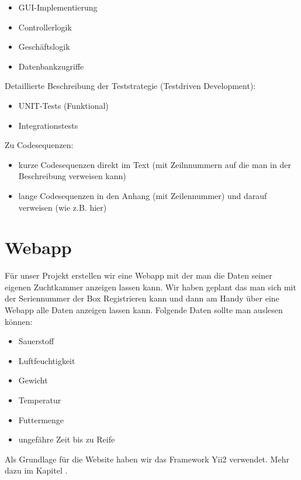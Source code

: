 \begin{itemize}
	\item GUI-Implementierung
	\item Controllerlogik
	\item Geschäftslogik
	\item Datenbankzugriffe
\end{itemize}

Detaillierte Beschreibung der Teststrategie (Testdriven Development):

\begin{itemize}
	\item UNIT-Tests (Funktional)
	\item Integrationstests
\end{itemize}

Zu Codesequenzen:
\begin{itemize}
	\item kurze Codesequenzen direkt im Text (mit Zeilnnummern auf die man in der Beschreibung verweisen kann)
	\item lange Codesequenzen in den Anhang (mit Zeilennummer) und darauf verweisen (wie z.B. hier)
	
	
\end{itemize}

\def \currentAuthor {Florian Tipotsch}

\section{Webapp}

Für unser Projekt erstellen wir eine Webapp mit der man die Daten seiner eigenen Zuchtkammer anzeigen lassen kann.
Wir haben geplant das man sich mit der Seriennummer der Box Registrieren kann und dann am Handy über eine Webapp alle Daten anzeigen lassen kann. Folgende Daten sollte man auslesen können:

\begin{itemize}
	\item Sauerstoff
	\item Luftfeuchtigkeit
	\item Gewicht
	\item Temperatur
	\item Futtermenge
	\item ungefähre Zeit bis zu Reife
\end{itemize}
Als Grundlage für die Website haben wir das Framework Yii2 verwendet. Mehr dazu im Kapitel .


